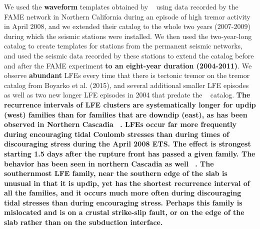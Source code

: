 \documentclass[draft]{agujournal2019}
\begin{document}
We used the \textbf{waveform} templates obtained by ~ using data recorded by the FAME network in Northern California during an episode of high tremor activity in April 2008, and we extended their catalog to the whole two years (2007-2009) during which the seismic stations were installed. We then used the two-year-long catalog to create templates for stations from the permanent seismic networks, and used the seismic data recorded by these stations to extend the catalog before and after the FAME experiment \textbf{to an eight-year duration (2004-2011)}. We observe \textbf{abundant} LFEs every time that there is tectonic tremor on the tremor catalog from Boyarko et al. (2015), and several additional smaller LFE episodes as well as two new longer LFE episodes in 2004 that predate the ~ catalog. \textbf{The recurrence intervals of LFE clusters are systematically longer for updip (west) families than for families that are downdip (east), as has been observed in Northern Cascadia ~\cite{SWE_2019}. LFEs occur far more frequently during encouraging tidal Coulomb stresses than during times of discouraging stress during the April 2008 ETS. The effect is strongest starting 1.5 days after the rupture front has passed a given family. The behavior has been seen in northern Cascadia as well ~\cite{HOU_2015}. The southernmost LFE family, near the southern edge of the slab is unusual in that it is updip, yet has the shortest recurrence interval of all the families, and it occurs much more often during discouraging tidal stresses than during encouraging stress. Perhaps this family is mislocated and is on a crustal strike-slip fault, or on the edge of the slab rather than on the subduction interface.}


\end{document}

